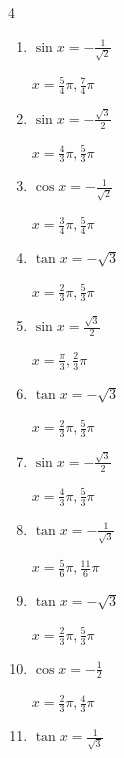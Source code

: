 \begin{multicols}{4}
\begin{enumerate}
        $\displaystyle x = \frac{3}{4}\pi , \frac{5}{4}\pi$

  \item $\displaystyle \sin{x}  = -\frac{1}{\sqrt{2}}$

        $\displaystyle x = \frac{5}{4}\pi , \frac{7}{4}\pi$

  \item $\displaystyle \sin{x}  = -\frac{\sqrt{3}}{2}$

        $\displaystyle x = \frac{4}{3}\pi , \frac{5}{3}\pi$

  \item $\displaystyle \cos{x}  = -\frac{1}{\sqrt{2}}$

        $\displaystyle x = \frac{3}{4}\pi , \frac{5}{4}\pi$

  \item $\displaystyle \tan{x}  = -\sqrt{3}$

        $\displaystyle x = \frac{2}{3}\pi , \frac{5}{3}\pi$

  \item $\displaystyle \sin{x}  = \frac{\sqrt{3}}{2}$

        $\displaystyle x = \frac{\pi}{3} , \frac{2}{3}\pi$

\columnbreak %

  \item $\displaystyle \tan{x}  = -\sqrt{3}$

        $\displaystyle x = \frac{2}{3}\pi , \frac{5}{3}\pi$

  \item $\displaystyle \sin{x}  = -\frac{\sqrt{3}}{2}$

        $\displaystyle x = \frac{4}{3}\pi , \frac{5}{3}\pi$

  \item $\displaystyle \tan{x}  = -\frac{1}{\sqrt{3}}$

        $\displaystyle x = \frac{5}{6}\pi , \frac{11}{6}\pi$

  \item $\displaystyle \tan{x}  = -\sqrt{3}$

        $\displaystyle x = \frac{2}{3}\pi , \frac{5}{3}\pi$

  \item $\displaystyle \cos{x}  = -\frac{1}{2}$

        $\displaystyle x = \frac{2}{3}\pi , \frac{4}{3}\pi$

  \item $\displaystyle \tan{x}  = \frac{1}{\sqrt{3}}$


\end{enumerate}
\end{multicols}
